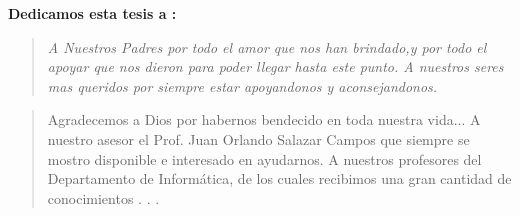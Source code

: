  
 {\bf\Large {Dedicamos esta tesis a :}}
 \vskip 1cm
\begin{quotation}
{\it A Nuestros Padres por todo el amor que nos han brindado,y por todo el apoyar que nos dieron para poder llegar hasta este punto.
\vskip 1cm
A nuestros seres mas queridos por siempre estar apoyandonos y aconsejandonos.
}
\end{quotation}


\newpage

 {\bf\Large {}}
 \vskip 1.5cm
\begin{quotation}
Agradecemos a Dios por habernos bendecido en toda nuestra vida...
{\vskip 1cm}
A nuestro asesor el Prof. Juan Orlando Salazar Campos que siempre se mostro disponible e interesado en ayudarnos.
\vskip 1cm
A nuestros profesores del Departamento de Informática, de los cuales recibimos una gran cantidad de conocimientos  . . .
\vskip 1cm
 \end{quotation}


